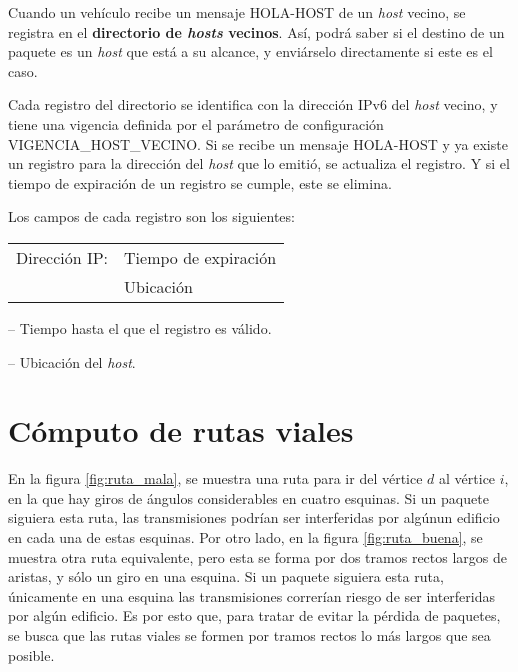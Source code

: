 \begin{sloppypar}
Cuando un vehículo recibe un mensaje \mbox{HOLA-HOST} de un \textit{host}
vecino, se registra en el \textbf{directorio de \textit{hosts} vecinos}. Así,
podrá saber si el destino de un paquete es un \textit{host} que está a su
alcance, y enviárselo directamente si este es el caso.
\end{sloppypar}

\begin{sloppypar}
Cada registro del directorio se identifica con la dirección IPv6 del
\textit{host} vecino, y tiene una vigencia definida por el parámetro de
configuración \mbox{VIGENCIA\_HOST\_VECINO}. Si se recibe un mensaje
\mbox{HOLA-HOST} y ya existe un registro para la dirección del \textit{host} que
lo emitió, se actualiza el registro. Y si el tiempo de expiración de un registro
se cumple, este se elimina.
\end{sloppypar}

Los campos de cada registro son los siguientes:

\begin{center}
\begin{tabular}{ r l }
Dirección IP: & Tiempo de expiración \\
& Ubicación \\
\end{tabular}
\end{center}

 -- Tiempo hasta el que el registro es válido.

 -- Ubicación del \textit{host}.

\section{Cómputo de rutas viales}
\label{sec:computo_rutas_viales}

En la figura \ref{fig:ruta_mala}, se muestra una ruta para ir del vértice $d$
al vértice $i$, en la que hay giros de ángulos considerables en cuatro esquinas.
Si un paquete siguiera esta ruta, las transmisiones podrían ser interferidas por
algúnun edificio en cada una de estas esquinas. Por otro lado, en la figura
\ref{fig:ruta_buena}, se muestra otra ruta equivalente, pero esta se forma por
dos tramos rectos largos de aristas, y sólo un giro en una esquina. Si un
paquete siguiera esta ruta, únicamente en una esquina las transmisiones
correrían riesgo de ser interferidas por algún edificio. Es por esto que,
para tratar de evitar la pérdida de paquetes, se busca que las rutas viales se
formen por tramos rectos lo más largos que sea posible.

